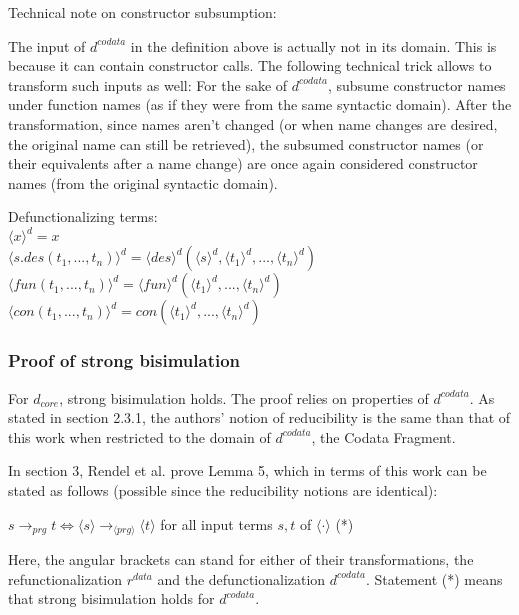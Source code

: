Technical note on constructor subsumption:

The input of $d^{codata}$ in the definition above is actually not in its domain. This is because it can contain constructor calls. The following technical trick allows to transform such inputs as well: For the sake of $d^{codata}$, subsume constructor names under function names (as if they were from the same syntactic domain). After the transformation, since names aren't changed (or when name changes are desired, the original name can still be retrieved), the subsumed constructor names (or their equivalents after a name change) are once again considered constructor names (from the original syntactic domain).

Defunctionalizing terms: \\
$\langle x \rangle^d = x$ \\
$\langle s.des(t_1, ..., t_n) \rangle^d = \langle des \rangle^d (\langle s \rangle^d, \langle t_1 \rangle^d, ..., \langle t_n \rangle^d)$ \\
$\langle fun(t_1, ..., t_n) \rangle^d = \langle fun \rangle^d (\langle t_1 \rangle^d, ..., \langle t_n \rangle^d)$ \\
$\langle con(t_1, ..., t_n) \rangle^d = con(\langle t_1 \rangle^d, ..., \langle t_n \rangle^d)$ \\

\subsubsection{Proof of strong bisimulation}

For $d_{core}$, strong bisimulation holds. The proof relies on properties of $d^{codata}$. As stated in section 2.3.1, the authors' notion of reducibility is the same than that of this work when restricted to the domain of $d^{codata}$, the Codata Fragment.

In section 3, Rendel et al. prove Lemma 5, which in terms of this work can be stated as follows (possible since the reducibility notions are identical):

$s \longrightarrow_{prg} t \iff \langle s \rangle \longrightarrow_{\langle prg \rangle} \langle t \rangle$ for all input terms $s,t$ of $\langle \cdot \rangle$ (*)

Here, the angular brackets can stand for either of their transformations, the refunctionalization $r^{data}$ and the defunctionalization $d^{codata}$. Statement (*) means that strong bisimulation holds for $d^{codata}$.

